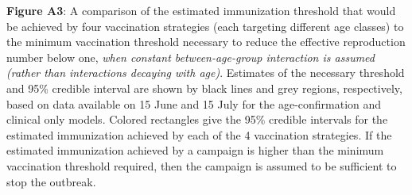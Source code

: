 \textbf{Figure A3}: A comparison of the estimated immunization threshold that would be achieved by four vaccination strategies (each targeting different age classes) to the minimum vaccination threshold necessary to reduce the effective reproduction number below one, \emph{when constant between-age-group interaction is assumed (rather than interactions decaying with age)}. Estimates of the necessary threshold and 95\% credible interval are shown by black lines and grey regions, respectively, based on data available on 15 June and 15 July for the age-confirmation and clinical only models.  Colored rectangles give the 95\% credible intervals for the estimated immunization achieved by each of the 4 vaccination strategies. If the estimated immunization achieved by a campaign is higher than the minimum vaccination threshold required, then the campaign is assumed to be sufficient to stop the outbreak.